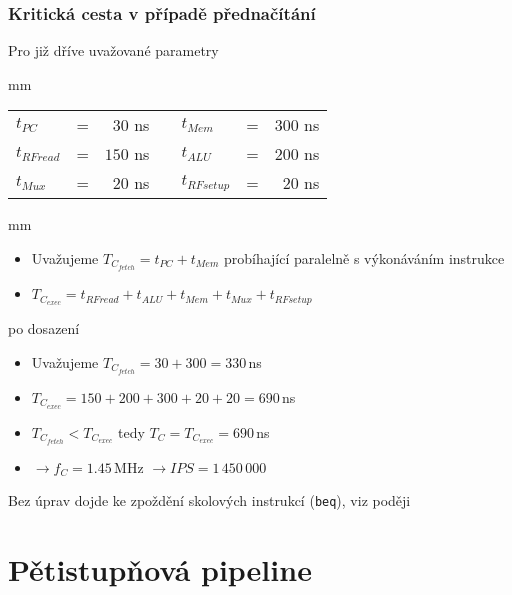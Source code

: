 \documentclass{beamer}
\begin{document}
\begin{frame}
\frametitle{Kritická cesta v případě přednačítání}

Pro již dříve uvažované parametry

 mm

\begin{tabular}{l c r m{1 cm} l c r}
$t_{PC}$ & = & $30$ ns & & $t_{Mem}$ & = & $300$ ns \\
$t_{RFread}$ & = & $150$ ns  & & $t_{ALU}$ & = & $200$ ns \\
$t_{Mux}$ & = & $20$ ns  & & $t_{RFsetup}$ & = & $20$ ns \\
\end{tabular}

 mm

\begin{itemize}
 \item Uvažujeme $T_{C_{fetch}} =  t_{PC} + t_{Mem}$ probíhající paralelně s výkonáváním instrukce
 \item $T_{C_{exec}} = t_{RFread} + t_{ALU} + t_{Mem} + t_{Mux} + t_{RFsetup}$
\end{itemize}

po dosazení

\begin{itemize}
 \item Uvažujeme $T_{C_{fetch}} =  30 + 300 = 330$\,ns
 \item $T_{C_{exec}} = 150 + 200 + 300 + 20 + 20 = 690$\,ns
 \item $T_{C_{fetch}} < T_{C_{exec}}$ tedy $T_{C} = T_{C_{exec}} = 690$\,ns
 \item $\rightarrow f_{C} = 1.45$\,MHz $\rightarrow IPS = 1\,450\,000$
\end{itemize}

Bez úprav dojde ke zpoždění skolových instrukcí (\texttt{beq}), viz poději

\end{frame}

\section{Pětistupňová pipeline}
\end{document}
